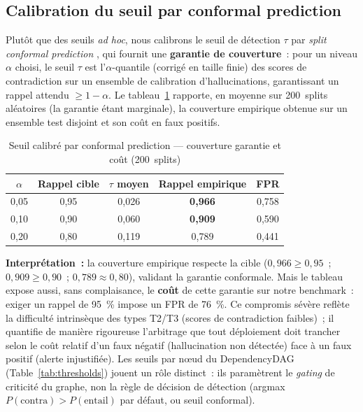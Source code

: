 \documentclass[12pt,a4paper]{article}
\begin{document}
\subsection{Calibration du seuil par conformal prediction}
\label{sec:conformal}

Plutôt que des seuils \textit{ad hoc}, nous calibrons le seuil de détection $\tau$ par \emph{split conformal prediction} \cite{angelopoulos2023conformal}, qui fournit une \textbf{garantie de couverture}~: pour un niveau $\alpha$ choisi, le seuil $\tau$ est l'$\alpha$-quantile (corrigé en taille finie) des scores de contradiction sur un ensemble de calibration d'hallucinations, garantissant un rappel attendu $\geq 1-\alpha$. Le tableau~\ref{tab:conformal} rapporte, en moyenne sur 200~splits aléatoires (la garantie étant marginale), la couverture empirique obtenue sur un ensemble test disjoint et son coût en faux positifs.

\begin{table}[H]
\centering
\caption{Seuil calibré par conformal prediction --- couverture garantie et coût (200~splits)}
\label{tab:conformal}
\renewcommand{\arraystretch}{1.2}
\begin{tabular}{ccccc}
\toprule
\textbf{$\alpha$} & \textbf{Rappel cible} & \textbf{$\tau$ moyen} & \textbf{Rappel empirique} & \textbf{FPR} \\
\midrule
0,05 & 0,95 & 0,026 & \textbf{0,966} & 0,758 \\
0,10 & 0,90 & 0,060 & \textbf{0,909} & 0,590 \\
0,20 & 0,80 & 0,119 & 0,789 & 0,441 \\
\bottomrule
\end{tabular}
\end{table}

\textbf{Interprétation~:} la couverture empirique respecte la cible ($0{,}966 \geq 0{,}95$~; $0{,}909 \geq 0{,}90$~; $0{,}789 \approx 0{,}80$), validant la garantie conformale. Mais le tableau expose aussi, sans complaisance, le \textbf{coût} de cette garantie sur notre benchmark~: exiger un rappel de 95~\% impose un FPR de 76~\%. Ce compromis sévère reflète la difficulté intrinsèque des types T2/T3 (scores de contradiction faibles)~; il quantifie de manière rigoureuse l'arbitrage que tout déploiement doit trancher selon le coût relatif d'un faux négatif (hallucination non détectée) face à un faux positif (alerte injustifiée). Les seuils par nœud du DependencyDAG (Table~\ref{tab:thresholds}) jouent un rôle distinct~: ils paramètrent le \emph{gating} de criticité du graphe, non la règle de décision de détection (argmax $P(\text{contra}) > P(\text{entail})$ par défaut, ou seuil conformal).
\end{document}

